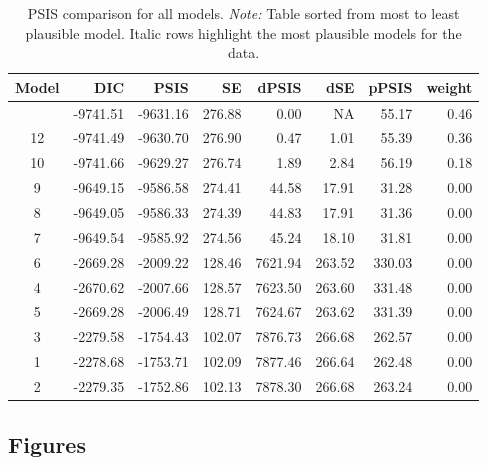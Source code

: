 \documentclass[
  authoryear,
  preprint,
  1p]{elsarticle}
\begin{document}
\begin{longtable}[]{@{}crrrrrrr@{}}

\caption{\label{tbl-rq3-psis}PSIS comparison for all models.
\emph{Note:} Table sorted from most to least plausible model. Italic
rows highlight the most plausible models for the data.}

\tabularnewline

\toprule\noalign{}
Model & DIC & PSIS & SE & dPSIS & dSE & pPSIS & weight \\
\midrule\noalign{}
\endhead
\bottomrule\noalign{}
\endlastfoot
11 & -9741.51 & -9631.16 & 276.88 & 0.00 & NA & 55.17 & 0.46 \\
12 & -9741.49 & -9630.70 & 276.90 & 0.47 & 1.01 & 55.39 & 0.36 \\
10 & -9741.66 & -9629.27 & 276.74 & 1.89 & 2.84 & 56.19 & 0.18 \\
9 & -9649.15 & -9586.58 & 274.41 & 44.58 & 17.91 & 31.28 & 0.00 \\
8 & -9649.05 & -9586.33 & 274.39 & 44.83 & 17.91 & 31.36 & 0.00 \\
7 & -9649.54 & -9585.92 & 274.56 & 45.24 & 18.10 & 31.81 & 0.00 \\
6 & -2669.28 & -2009.22 & 128.46 & 7621.94 & 263.52 & 330.03 & 0.00 \\
4 & -2670.62 & -2007.66 & 128.57 & 7623.50 & 263.60 & 331.48 & 0.00 \\
5 & -2669.28 & -2006.49 & 128.71 & 7624.67 & 263.62 & 331.39 & 0.00 \\
3 & -2279.58 & -1754.43 & 102.07 & 7876.73 & 266.68 & 262.57 & 0.00 \\
1 & -2278.68 & -1753.71 & 102.09 & 7877.46 & 266.64 & 262.48 & 0.00 \\
2 & -2279.35 & -1752.86 & 102.13 & 7878.30 & 266.68 & 263.24 & 0.00 \\

\end{longtable}

\newpage{}

\subsection{Figures}\label{sec-appC}
\end{document}
